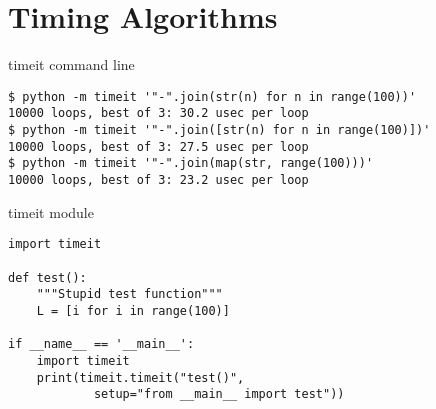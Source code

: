 \section{Timing Algorithms}

\begin{frame}[fragile]{timeit command line}
  \begin{verbatim}
$ python -m timeit '"-".join(str(n) for n in range(100))'
10000 loops, best of 3: 30.2 usec per loop
$ python -m timeit '"-".join([str(n) for n in range(100)])'
10000 loops, best of 3: 27.5 usec per loop
$ python -m timeit '"-".join(map(str, range(100)))'
10000 loops, best of 3: 23.2 usec per loop
  \end{verbatim}
\end{frame}

\begin{frame}[fragile]{timeit module}
  \begin{verbatim}
import timeit

def test():
    """Stupid test function"""
    L = [i for i in range(100)]

if __name__ == '__main__':
    import timeit
    print(timeit.timeit("test()",
            setup="from __main__ import test"))
  \end{verbatim}
\end{frame}
